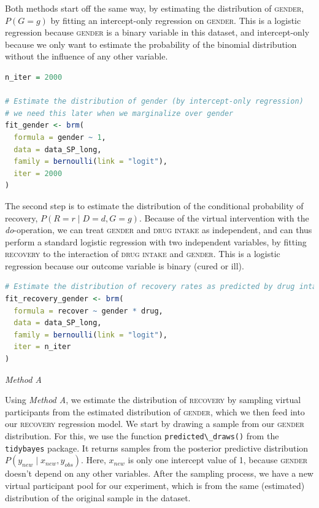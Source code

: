\documentclass[nobib]{tufte-handout}
\newcommand{\ri}[1]{\mbox{\lstinline{#1}}\xspace}  %
\newcommand{\doop}{\emph{do}-operation\xspace}
\begin{document}
Both methods start off the same way, by estimating the distribution of \textsc{gender}, $P\left( G=g \right)$ by fitting an intercept-only regression on \textsc{gender}.
This is a logistic regression because \textsc{gender} is a binary variable in this dataset, and intercept-only because we only want to estimate the probability of the binomial distribution without the influence of any other variable. 

\begin{minipage}[]{\textwidth}
\begin{lstlisting}[language=R]
n_iter = 2000

# Estimate the distribution of gender (by intercept-only regression)
# we need this later when we marginalize over gender
fit_gender <- brm(
  formula = gender ~ 1,
  data = data_SP_long,
  family = bernoulli(link = "logit"),
  iter = 2000
)
\end{lstlisting}
\end{minipage}

\vspace{-0.5cm}

The second step is to estimate the distribution of the conditional probability of recovery, $P\left(R = r \mid D=d, G=g \right)$.
Because of the virtual intervention with the \doop, we can treat \textsc{gender} and \textsc{drug intake} as independent, and can thus perform a standard logistic regression with two independent variables, by fitting \textsc{recovery} to the interaction of \textsc{drug intake} and \textsc{gender}. 
This is a logistic regression because our outcome variable is binary (cured or ill). 

\begin{minipage}[]{\textwidth}
\begin{lstlisting}[language=R]
# Estimate the distribution of recovery rates as predicted by drug intake and gender
fit_recovery_gender <- brm(
  formula = recover ~ gender * drug,
  data = data_SP_long,
  family = bernoulli(link = "logit"),
  iter = n_iter
)
\end{lstlisting}
\end{minipage}

\vspace{-0.5cm}
\emph{Method A}

Using \emph{Method A}, we estimate the distribution of \textsc{recovery} by sampling virtual participants from the estimated distribution of \textsc{gender}, which we then feed into our \textsc{recovery} regression model.
We start by drawing a sample from our \textsc{gender} distribution. 
For this, we use the function \ri{predicted\_draws()} from the \ri{tidybayes} package.
It returns samples from the posterior predictive distribution $P(y_{new} \mid x_{new}, y_{obs})$.
Here, $x_{new}$ is only one intercept value of 1, because \textsc{gender} doesn't depend on any other variables. After the sampling process, we have a new virtual participant pool for our experiment, which is from the same (estimated) distribution of the original sample in the dataset.
\end{document}
